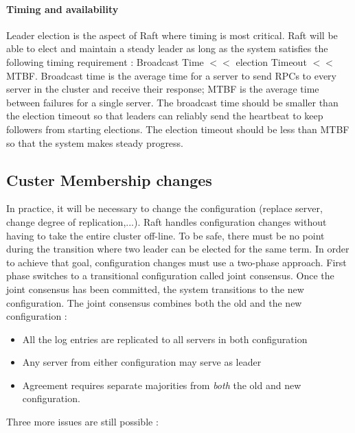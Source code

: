 \paragraph{Timing and availability}
Leader election is the aspect of Raft where timing is most critical. Raft will be able to elect and maintain a steady leader as long as the system satisfies the following timing requirement : Broadcast Time $<<$ election Timeout $<<$ MTBF. Broadcast time is the average time for a server to send RPCs to every server in the cluster and receive their response; MTBF is the average time between failures for a single server. The broadcast time should be smaller than the election timeout so that leaders can reliably send the heartbeat to keep followers from starting elections. The election timeout should be less than MTBF so that the system makes steady progress. 

\subsection{Custer Membership changes}

In practice, it will be necessary to change the configuration (replace server, change degree of replication,...). Raft handles configuration changes without having to take the entire cluster off-line. To be safe, there must be no point during the transition where two leader can be elected for the same term. In order to achieve that goal, configuration changes must use a two-phase approach. First phase switches to a transitional configuration called joint consensus. Once the joint consensus has been committed, the system transitions to the new configuration. The joint consensus combines both the old and the new configuration : 
\begin{itemize}
\item All the log entries are replicated to all servers in both configuration
\item Any server from either configuration may serve as leader
\item Agreement requires separate majorities from \textit{both} the old and new configuration. 
\end{itemize}

Three more issues are still possible :

